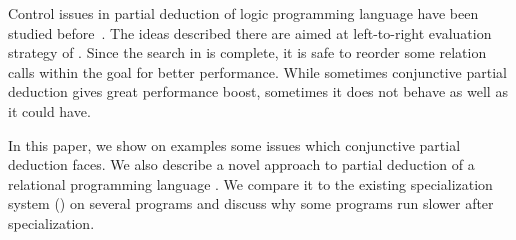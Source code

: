 Control issues in partial deduction of logic programming language \pro have been studied before~\cite{leuschel2002logic}.
The ideas described there are aimed at left-to-right evaluation strategy of \pro.
Since the search in \mk is complete, it is safe to reorder some relation calls within the goal for better performance.
While sometimes conjunctive partial deduction gives great performance boost, sometimes it does not behave as well as it could have.

In this paper, we show on examples some issues which conjunctive partial deduction faces.
We also describe a novel approach to partial deduction of a relational programming language \mk.
We compare it to the existing specialization system (\ecce) on several programs and discuss why some \mk programs run slower after specialization.

